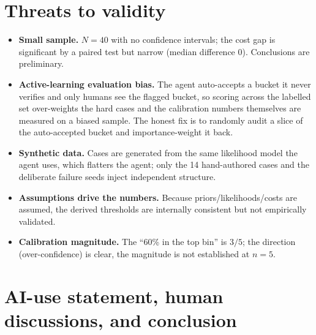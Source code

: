 \documentclass[11pt]{article}
\begin{document}
\section{Threats to validity}
\label{sec:threats}

\begin{itemize}[nosep]
  \item \textbf{Small sample.} $N=40$ with no confidence intervals; the cost gap is
        significant by a paired test but narrow (median difference $0$). Conclusions are
        preliminary.
  \item \textbf{Active-learning evaluation bias.} The agent auto-accepts a bucket it
        never verifies and only humans see the flagged bucket, so scoring across the
        labelled set over-weights the hard cases and the calibration numbers themselves
        are measured on a biased sample. The honest fix is to randomly audit a slice of
        the auto-accepted bucket and importance-weight it back.
  \item \textbf{Synthetic data.} Cases are generated from the same likelihood model the
        agent uses, which flatters the agent; only the 14 hand-authored cases and the
        deliberate failure seeds inject independent structure.
  \item \textbf{Assumptions drive the numbers.} Because priors/likelihoods/costs are
        assumed, the derived thresholds are internally consistent but not empirically
        validated.
  \item \textbf{Calibration magnitude.} The ``60\% in the top bin'' is $3/5$; the
        direction (over-confidence) is clear, the magnitude is not established at $n=5$.
\end{itemize}

\section{AI-use statement, human discussions, and conclusion}
\label{sec:human}
\end{document}
